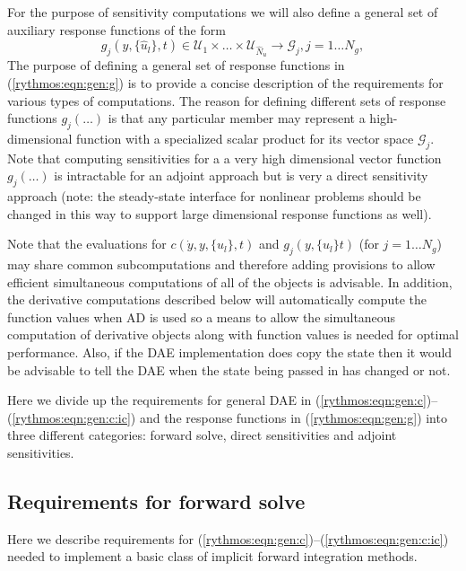 \documentclass[pdf,ps2pdf,11pt]{SANDreport}
\begin{document}
For the purpose of sensitivity computations we will also define a general
set of auxiliary response functions of the form
%
\begin{equation}
g_j(y,\{\hat{u}_l\},t) \in \mathcal{U}_1 \times \ldots \times \mathcal{U}_{\hat{N}_u} \rightarrow \mathcal{G}_j, j=1 \ldots N_g, 
\label{rythmos:eqn:gen:g}
\end{equation}
%
The purpose of defining a general set of response functions in
(\ref{rythmos:eqn:gen:g}) is to provide a concise description of the
requirements for various types of computations.  The reason for defining
different sets of response functions $g_j(\ldots)$ is that any particular
member may represent a high-dimensional function with a specialized scalar
product for its vector space $\mathcal{G}_j$.  Note that computing
sensitivities for a a very high dimensional vector function $g_j(\ldots)$ is
intractable for an adjoint approach but is very a direct sensitivity approach
(note: the steady-state interface for nonlinear problems should be changed in
this way to support large dimensional response functions as well).

Note that the evaluations for $c(\dot{y},y,\{u_l\},t)$ and $g_j(y,\{u_l\}t)$
(for $j = 1 {}\ldots N_g$) may share common subcomputations and therefore
adding provisions to allow efficient simultaneous computations of all of the
objects is advisable.  In addition, the derivative computations described
below will automatically compute the function values when AD is used so a
means to allow the simultaneous computation of derivative objects along with
function values is needed for optimal performance.  Also, if the DAE
implementation does copy the state then it would be advisable to tell the DAE
when the state being passed in has changed or not.

Here we divide up the requirements for general DAE in
(\ref{rythmos:eqn:gen:c})--(\ref{rythmos:eqn:gen:c:ic}) and the response
functions in (\ref{rythmos:eqn:gen:g}) into three different categories:
forward solve, direct sensitivities and adjoint sensitivities.

\subsection{Requirements for forward solve}

Here we describe requirements for
(\ref{rythmos:eqn:gen:c})--(\ref{rythmos:eqn:gen:c:ic}) needed to
implement a basic class of implicit forward integration methods.
\end{document}
